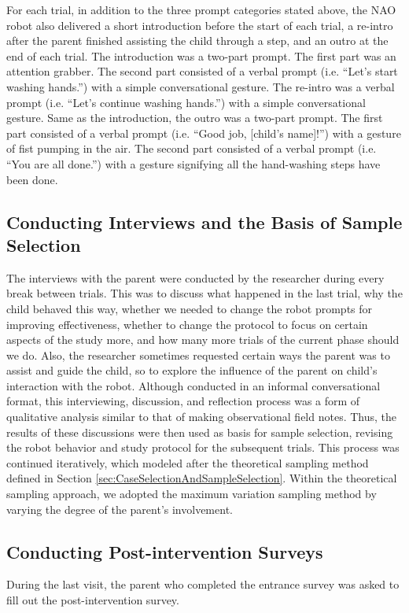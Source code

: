 For each trial, in addition to the three prompt categories stated above, the NAO robot also delivered a short introduction before the start of each trial, a re-intro after the parent finished assisting the child through a step, and an outro at the end of each trial. The introduction was a two-part prompt. The first part was an attention grabber. The second part consisted of a verbal prompt (i.e. “Let's start washing hands.”) with a simple conversational gesture. The re-intro was a verbal prompt (i.e. “Let's continue washing hands.”) with a simple conversational gesture. Same as the introduction, the outro was a two-part prompt. The first part consisted of a verbal prompt (i.e. “Good job, [child's name]!”) with a gesture of fist pumping in the air. The second part consisted of a verbal prompt (i.e. “You are all done.”) with a gesture signifying all the hand-washing steps have been done.

\subsection{Conducting Interviews and the Basis of Sample Selection}
\label{sec:ConductingInterviews}
The interviews with the parent were conducted by the researcher during every break between trials.  This was to discuss what happened in the last trial, why the child behaved this way, whether we needed to change the robot prompts for improving effectiveness, whether to change the protocol to focus on certain aspects of the study more, and how many more trials of the current phase should we do.  Also, the researcher sometimes requested certain ways the parent was to assist and guide the child, so to explore the influence of the parent on child's interaction with the robot.  Although conducted in an informal conversational format, this interviewing, discussion, and reflection process was a form of qualitative analysis similar to that of making observational field notes.  Thus, the results of these discussions were then used as basis for sample selection, revising the robot behavior and study protocol for the subsequent trials.  This process was continued iteratively, which modeled after the theoretical sampling method defined in Section \ref{sec:CaseSelectionAndSampleSelection}.  Within the theoretical sampling approach, we adopted the maximum variation sampling method by varying the degree of the parent's involvement.

\subsection{Conducting Post-intervention Surveys}
During the last visit, the parent who completed the entrance survey was asked to fill out the post-intervention survey.

